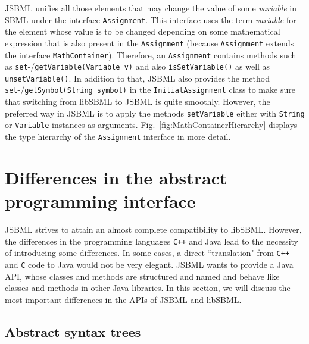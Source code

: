 \documentclass[
  BCOR12mm,
  letterpaper,
  11pt,
  headsepline,
  pointlessnumbers,
  tablecaptionabove,
  onelinecaption,
  headinclude,
  appendixprefix,
  idxtotoc,
  bibtotoc,
  twoside,
  titlepage
]{scrartcl}
\begin{document}
JSBML
unifies all those elements that may
change the value of some \emph{variable} in SBML under the interface
\texttt{Assignment}. This interface uses the term \emph{variable}
for the element whose value is to be changed
depending on some mathematical expression that is also present in the
\texttt{Assignment} (because \texttt{Assignment} extends the interface
\texttt{MathContainer}).
Therefore,
an \texttt{Assignment} contains methods such as
\texttt{set}-/\texttt{getVariable(Variable v)} and also \texttt{isSetVariable()}
as well as \texttt{unsetVariable()}. In addition to that, JSBML also provides
the method \texttt{set}-/\texttt{getSymbol(String symbol)} in the
\texttt{InitialAssignment}
class to make sure that switching from libSBML
to JSBML is quite smoothly.
However, the preferred way in JSBML
is to apply the methods \texttt{setVariable} either with \texttt{String}
or \texttt{Variable} instances as arguments.
Fig.~\vref{fig:MathContainerHierarchy} displays the type hierarchy of the
\texttt{Assignment} interface in more detail.



\section{Differences in the abstract programming interface}

JSBML strives to attain an almost complete compatibility to libSBML. However,
the differences in the programming languages \texttt{C++}
and Java\texttrademark{} lead to the necessity of introducing some differences.
In some cases, a direct ``translation" from \texttt{C++} and \texttt{C} code to
Java would not be very elegant. JSBML wants to provide a Java
API, whose classes and methods are
structured and named and behave like classes and methods in other Java
libraries. In this section, we will discuss the most important differences in
the APIs of JSBML and
libSBML.


\subsection{Abstract syntax trees}
\end{document}
